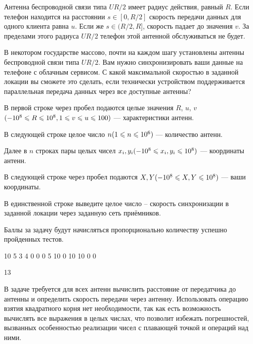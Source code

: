 
Антенна беспроводной связи типа $UR/2$ имеет радиус действия, равный $R$. Если телефон находится на расстоянии $s \in [0, R/2]$  скорость передачи данных для одного клиента равна $u$. Если же $s \in (R/2, R]$, скорость падает до значения $v$. За пределами этого радиуса $UR/2$ телефон этой антенной обслуживаться не будет.

В некотором государстве массово, почти на каждом шагу установлены антенны беспроводной связи типа $UR/2$. Вам нужно синхронизировать ваши данные на телефоне с облачным сервисом. С какой максимальной скоростью в заданной локации вы сможете это сделать, если технически устройством поддерживается параллельная передача данных через все доступные антенны?


В первой строке через пробел подаются целые значения $R$, $u$, $v$ \linebreak $(-10^8\leq R\leq 10^8,\space 1\leq v \leq u \leq 100)$ — характеристики антенн.

В следующей строке целое число $n\space (1\leq n\leq 10^6)$  — количество антенн. 

Далее в $n$ строках пары целых чисел $x_i, y_i \space (-10^8\leq x_i, y_i \leq 10^8)$  — координаты антенн.

В следующей строке через пробел подаются $X, Y \space (-10^8\leq X, Y \leq 10^8)$ — ваши координаты.

\outputfmtSection

В единственной строке выведите целое число -- скорость синхронизации в заданной локации через заданную сеть приёмников.

\markSection

Баллы за задачу будут начисляться пропорционально количеству успешно пройденных тестов.


\begin{myverbbox}[\small]{\vinput}
    10 5 3
    4
    0 0
    0 5
    10 0
    10 10
    0 0
\end{myverbbox}

\begin{myverbbox}[\small]{\voutput}
    13
\end{myverbbox}

\solutionSection

В задаче требуется для всех антенн вычислить расстояние от передатчика до антенны и определить скорость передачи через антенну. Использовать операцию взятия квадратного корня нет необходимости, так как есть возможность вычислять все выражения в целых числах, что позволит избежать погрешностей, вызванных особенностью реализации чисел с плавающей точкой и операций над ними. 

